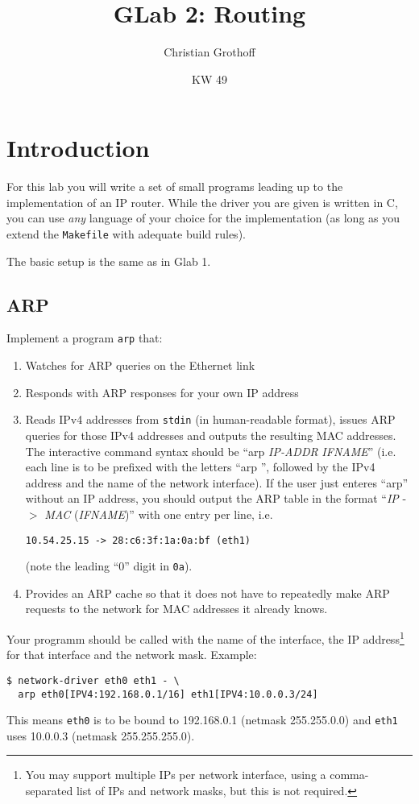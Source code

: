 \documentclass{article}
\title{GLab 2: Routing}
\author{Christian Grothoff}
\date{KW 49}
\begin{document}
\maketitle

\section{Introduction}

For this lab you will write a set of small programs leading up to the
implementation of an IP router.  While the driver you are given
is written in C, you can use {\em any} language of your choice for the
implementation (as long as you extend the {\tt Makefile} with adequate
build rules).

The basic setup is the same as in Glab 1.

\subsection{ARP}

Implement a program {\tt arp} that:
\begin{enumerate}
\item Watches for ARP queries on the Ethernet link
\item Responds with ARP responses for your own IP address
\item Reads IPv4 addresses from {\tt stdin} (in human-readable format),
  issues ARP queries for those IPv4 addresses and outputs the
  resulting MAC addresses.  The interactive command syntax should be
  ``arp {\em IP-ADDR} {\em IFNAME}'' (i.e. each line is to be prefixed with
  the letters ``arp '', followed by the IPv4 address and the name of
  the network interface).  If the user just enteres ``arp'' without
  an IP address, you should output the ARP table in the format
  ``{\em IP} -$>$ {\em MAC} ({\em IFNAME})'' with one entry per line,
  i.e.
\begin{verbatim}
10.54.25.15 -> 28:c6:3f:1a:0a:bf (eth1)
\end{verbatim}
  (note the leading ``0'' digit in {\tt 0a}).
\item Provides an ARP cache so that it does not have to repeatedly
  make ARP requests to the network for MAC addresses it already knows.
\end{enumerate}
Your programm should be called with the name of the interface, the IP
address\footnote{You may support multiple IPs per network interface,
  using a comma-separated list of IPs and network masks, but this is
  not required.} for that interface and the network mask.  Example:
\begin{verbatim}
$ network-driver eth0 eth1 - \
  arp eth0[IPV4:192.168.0.1/16] eth1[IPV4:10.0.0.3/24]
\end{verbatim}
This means {\tt eth0} is to be bound to 192.168.0.1 (netmask 255.255.0.0)
and {\tt eth1} uses 10.0.0.3 (netmask 255.255.255.0).
\end{document}
